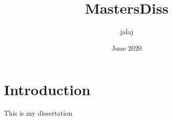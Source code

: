 \documentclass{article}
\title{MastersDiss}
\author{jalaj }
\date{June 2020}
\begin{document}
\maketitle

\section{Introduction}
This is my dissertation
\end{document}
